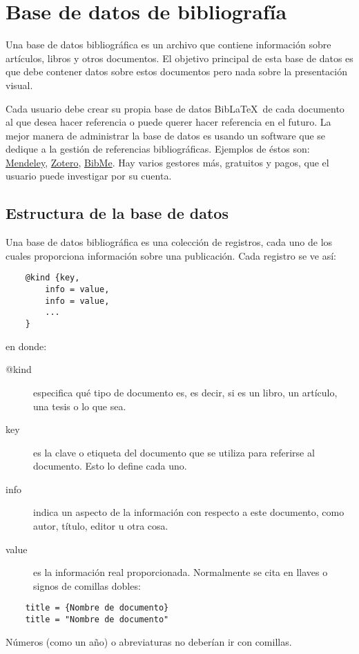 \section{Base de datos de bibliografía}

Una base de datos bibliográfica es un archivo que contiene información sobre artículos, libros y otros documentos. El objetivo principal de esta base de datos es que debe contener datos sobre estos documentos pero nada sobre la presentación visual.

Cada usuario debe crear su propia base de datos Bib\LaTeX\ de cada documento al que desea hacer referencia o puede querer hacer referencia en el futuro. La mejor manera de administrar la base de datos es usando un software que se dedique a la gestión de referencias bibliográficas. Ejemplos de éstos son: \hyperref{https://www.mendeley.com/?interaction_required=true}{}{}{Mendeley}, \hyperref{https://www.zotero.org/}{}{}{Zotero}, \hyperref{https://www.bibme.org/}{}{}{BibMe}. Hay varios gestores más, gratuitos y pagos, que el usuario puede investigar por su cuenta.

\subsection{Estructura de la base de datos}
Una base de datos bibliográfica es una colección de registros, cada uno de los cuales proporciona información sobre una publicación. Cada registro se ve así:
\begin{lstlisting}
	@kind {key,
		info = value,
		info = value,
		...
	}
\end{lstlisting}
\noindent
en donde:
\begin{description}
	\item[@kind] especifica qué tipo de documento es, es decir, si es un libro, un artículo, una tesis o lo que sea. 
	\item[key] es la clave o etiqueta del documento que se utiliza para referirse al documento. Esto lo define cada uno.
	\item[info] indica un aspecto de la información con respecto a este documento, como autor, título, editor u otra cosa.
	\item[value] es la información real proporcionada. Normalmente se cita en llaves o signos de comillas dobles:
\end{description}
\begin{lstlisting}
	title = {Nombre de documento}
	title = "Nombre de documento"
\end{lstlisting}
Números (como un año) o abreviaturas no deberían ir con comillas. 

